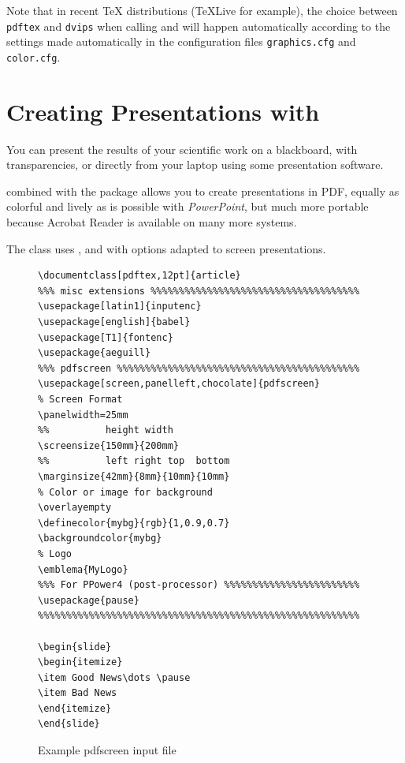 Note that in recent \TeX{} distributions (\TeX{}Live for example), the
choice between \texttt{pdftex} and \texttt{dvips} when calling
 and   will happen automatically according to
the settings made automatically in the configuration files
\texttt{graphics.cfg} and \texttt{color.cfg}.

\section{Creating Presentations with }
\label{sec:pdfscreen}
You can present the results of your scientific work on a blackboard,
with transparencies, or directly from your laptop using some
presentation software. 

 combined with the  package allows you to
create presentations in PDF, equally as colorful and lively as
is possible with \emph{PowerPoint}, but much more portable because
Acrobat Reader is available on many more systems.


The  class uses ,  and
 with options adapted to screen presentations.

\begin{figure}[htbp]
\begin{verbatim}
\documentclass[pdftex,12pt]{article}
%%% misc extensions %%%%%%%%%%%%%%%%%%%%%%%%%%%%%%%%%%%%%
\usepackage[latin1]{inputenc}
\usepackage[english]{babel}
\usepackage[T1]{fontenc}
\usepackage{aeguill}
%%% pdfscreen %%%%%%%%%%%%%%%%%%%%%%%%%%%%%%%%%%%%%%%%%%%
\usepackage[screen,panelleft,chocolate]{pdfscreen}
% Screen Format
\panelwidth=25mm
%%          height width
\screensize{150mm}{200mm} 
%%          left right top  bottom
\marginsize{42mm}{8mm}{10mm}{10mm}
% Color or image for background
\overlayempty
\definecolor{mybg}{rgb}{1,0.9,0.7}
\backgroundcolor{mybg}
% Logo
\emblema{MyLogo}
%%% For PPower4 (post-processor) %%%%%%%%%%%%%%%%%%%%%%%%
\usepackage{pause}
%%%%%%%%%%%%%%%%%%%%%%%%%%%%%%%%%%%%%%%%%%%%%%%%%%%%%%%%%

\begin{slide}
\begin{itemize}
\item Good News\dots \pause
\item Bad News
\end{itemize}
\end{slide}

\end{verbatim}
    \caption{Example pdfscreen input file}   
    \label{fig:pdfscr}   
\end{figure}

